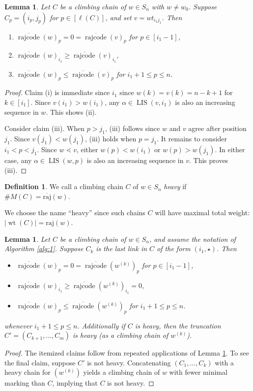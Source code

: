 \documentclass[11pt]{amsart}
\newtheorem{lemma}[theorem]{Lemma}
\theoremstyle{definition}
\newtheorem{definition}[theorem]{Definition}
\theoremstyle{named}
\DeclareMathOperator{\rr}{\mathrm{rajcode}} %
\newcommand{\orr}{\overline{\rr}} %
\newcommand{\absrajcode}[1]{\mathrm{raj}(#1)}
\newcommand{\absoverrajcode}[1]{\overline{\mathrm{raj}}(#1)}
\DeclareMathOperator{\LIS}{\mathrm{LIS}}
\DeclareMathOperator{\wt}{\mathrm{wt}}
\begin{document}
	\begin{lemma}
		\label{lem:drecursionanychain}
		Let $C$ be a climbing chain of $w\in S_n$ with $w\neq w_0$. Suppose $C_p=(i_p,j_p)$ for $p\in [\ell(C)]$, and set $v=wt_{i_1j_1}$. Then 
		\begin{enumerate}[label=\textup{(\roman*)}]
			\item $\orr(w)_p=0=\orr(v)_p$ for $p\in [i_1-1]$,
			\item $\orr(w)_{i_1}\geq \orr(v)_{i_1}$,
			\item $\orr(w)_p\leq \orr(v)_p$ for $i_1+1\leq p \leq n$.
		\end{enumerate}
	\end{lemma}
	\begin{proof}
		Claim (i) is immediate since $i_1$ since $w(k)=v(k)=n-k+1$ for $k\in[i_1]$. Since $v(i_1)>w(i_1)$, any $\alpha\in \LIS(v,i_1)$ is also an increasing sequence in $w$. This shows (ii). 
		
		Consider claim (iii). When $p>j_1$, (iii) follows since $w$ and $v$ agree after position $j_1$. Since $v(j_1)<w(j_1)$, (iii) holds when $p=j_1$. It remains to consider $i_1<p<j_1$. Since $w\lessdot v$, either $w(p)<w(i_1)$ or $w(p)>w(j_1)$. In either case, any $\alpha\in \LIS(w,p)$ is also an increasing sequence in $v$. This proves (iii).
	\end{proof}
	
	\begin{definition}
		We call a climbing chain $C$ of $w\in S_n$ \emph{heavy} if $\#M(C) = \absoverrajcode{w}$.
	\end{definition}
	We choose the name ``heavy'' since such chains $C$ will have maximal total weight: $|\wt(C)| = \absrajcode{w}$.

	\begin{lemma}
		\label{lem:heavytruncation}
		Let $C$ be a climbing chain of $w\in S_n$, and assume the notation of Algorithm \ref{alg:1}.
		Suppose $C_k$ is the last link in $C$ of the form $(i_1,\star)$. Then 
		\begin{itemize}
			\item $\orr(w)_p=0=\orr(w^{(k)})_p$ for $p\in [i_1-1]$,
			\item $\orr(w)_{i_1}\geq \orr(w^{(k)})_{i_1}=0$,
			\item $\orr(w)_p\leq \orr(w^{(k)})_p$ for $i_1+1\leq p \leq n$.
		\end{itemize}
		whenever $i_1+1\leq p\leq n$. Additionally if $C$ is heavy, then the truncation $C'=(C_{k+1},\ldots,C_m)$ is heavy (as a climbing chain of $w^{(k)}$).
	\end{lemma}
	\begin{proof}
		The itemized claims follow from repeated applications of Lemma \ref{lem:drecursionanychain}. To see the final claim, suppose $C'$ is not heavy. Concatenating $(C_1,\ldots,C_{k})$ with a heavy chain for $(w^{(k)})$ yields a climbing chain of $w$ with fewer minimal marking than $C$, implying that $C$ is not heavy.
	\end{proof}
\end{document}
